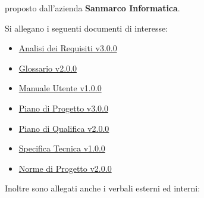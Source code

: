 \documentclass[10pt]{article}
\begin{document}
proposto dall’azienda \textbf{Sanmarco Informatica}.


Si allegano i seguenti documenti di interesse:
\begin{itemize}
  \item \href{https://github.com/7clickers/Documentazione-7clickers/blob/main/RTB/documentazione_esterna/analisi_dei_requisiti_v3.0.0.pdf}{Analisi dei Requisiti v3.0.0}
  \item \href{https://github.com/7clickers/Documentazione-7clickers/blob/main/RTB/documentazione_esterna/glossario_v1.0.0.pdf}{Glossario v2.0.0}
  \item \href{https://github.com/7clickers/Documentazione-7clickers/blob/main/RTB/documentazione_esterna/glossario_v1.0.0.pdf}{Manuale Utente v1.0.0}
  \item \href{https://github.com/7clickers/Documentazione-7clickers/blob/main/RTB/documentazione_esterna/piano_di_progetto_v2.0.0.pdf}{Piano di Progetto v3.0.0}
  \item \href{https://github.com/7clickers/Documentazione-7clickers/blob/main/RTB/documentazione_esterna/piano_di_qualifica_v1.0.0.pdf}{Piano di Qualifica v2.0.0}
  \item \href{https://github.com/7clickers/Documentazione-7clickers/blob/main/RTB/documentazione_esterna/piano_di_qualifica_v1.0.0.pdf}{Specifica Tecnica v1.0.0}
  \item \href{https://github.com/7clickers/Documentazione-7clickers/blob/main/RTB/documentazione_interna/norme_di_progetto_v1.0.0.pdf}{Norme di Progetto v2.0.0}
\end{itemize}

Inoltre sono allegati anche i verbali esterni ed interni:
\end{document}
